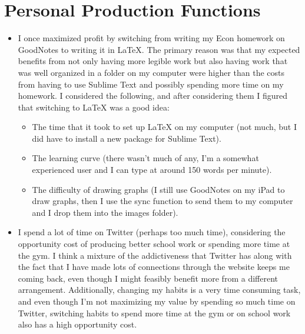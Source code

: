 \documentclass[8pt]{extarticle}
\begin{document}
{\section*{Personal Production Functions}
\begin{itemize}
	\item I once maximized profit by switching from writing my Econ homework on GoodNotes to writing it in LaTeX. The primary reason was that my expected benefits from not only having more legible work but also having work that was well organized in a folder on my computer were higher than the costs from having to use Sublime Text and possibly spending more time on my homework. I considered the following, and after considering them I figured that switching to LaTeX was a good idea:
	\begin{itemize}
		\item The time that it took to set up LaTeX on my computer (not much, but I did have to install a new package for Sublime Text).
		\item The learning curve (there wasn't much of any, I'm a somewhat experienced user and I can type at around 150 words per minute).
		\item The difficulty of drawing graphs (I still use GoodNotes on my iPad to draw graphs, then I use the sync function to send them to my computer and I drop them into the images folder).
	\end{itemize}
	\item I spend a lot of time on Twitter (perhaps too much time), considering the opportunity cost of producing better school work or spending more time at the gym. I think a mixture of the addictiveness that Twitter has along with the fact that I have made lots of connections through the website keeps me coming back, even though I might feasibly benefit more from a different arrangement. Additionally, changing my habits is a very time consuming task, and even though I'm not maximizing my value by spending so much time on Twitter, switching habits to spend more time at the gym or on school work also has a high opportunity cost.
\end{itemize}
}
\end{document}
